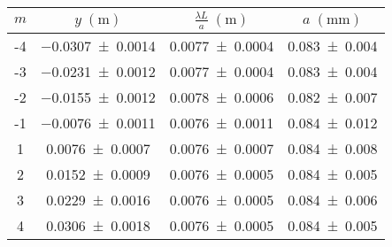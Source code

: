 \begin{tabular}{cc|cc}
\toprule
$m$ &      $y \; (\si{\m})$ & $\frac{\lambda L}{a} \; (\si{\m})$ &  $a \; (\si{\mm})$ \\
\midrule
 -4 & \num{-0.0307+-0.0014} &               \num{0.0077+-0.0004} & \num{0.083+-0.004} \\
 -3 & \num{-0.0231+-0.0012} &               \num{0.0077+-0.0004} & \num{0.083+-0.004} \\
 -2 & \num{-0.0155+-0.0012} &               \num{0.0078+-0.0006} & \num{0.082+-0.007} \\
 -1 & \num{-0.0076+-0.0011} &               \num{0.0076+-0.0011} & \num{0.084+-0.012} \\
  1 &  \num{0.0076+-0.0007} &               \num{0.0076+-0.0007} & \num{0.084+-0.008} \\
  2 &  \num{0.0152+-0.0009} &               \num{0.0076+-0.0005} & \num{0.084+-0.005} \\
  3 &  \num{0.0229+-0.0016} &               \num{0.0076+-0.0005} & \num{0.084+-0.006} \\
  4 &  \num{0.0306+-0.0018} &               \num{0.0076+-0.0005} & \num{0.084+-0.005} \\
\bottomrule
\end{tabular}
